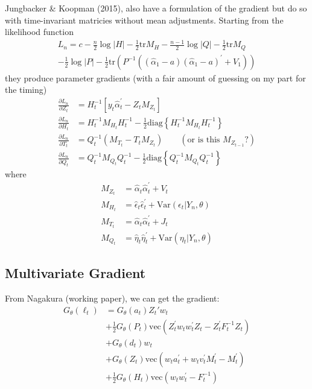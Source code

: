 \documentclass[12pt]{article}
\newcommand{\Gt}{G_\theta}
\newcommand{\vecop}[0]{\text{vec}}
\newcommand{\Var}[0]{\text{Var}}
\begin{document}
	\newpage
	Jungbacker \& Koopman (2015), also have a formulation of the gradient but do so with time-invariant matricies without mean adjustments. Starting from the likelihood function 
	\begin{align*}
	L_n = c - \frac{n}{2} \log |H| - \frac{1}{2} \text{tr} M_H - \frac{n-1}{2} \log |Q| - \frac{1}{2} \text{tr} M_Q \\ 
	- \frac{1}{2} \log |P| - \frac{1}{2} \text{tr} \left(P^{-1} ((\hat{\alpha}_1 - a) (\hat{\alpha}_1 - a)^\prime + V_1) \right)
	\end{align*}
	they produce parameter gradients (with a fair amount of guessing on my part for the timing)
	\begin{align*}
	\frac{\partial L_n}{\partial Z_t} &= H_t^{-1} \left[y_t\hat{\alpha}_t^\prime - Z_t M_{Z_t} \right] \\
	\frac{\partial L_n}{\partial H_t} &= H_t^{-1} M_{H_t} H_t^{-1} - \frac{1}{2} \text{diag} \left\{ H_t^{-1} M_{H_t} H_t^{-1}\right\} \\
	\frac{\partial L_n}{\partial T_t} &= Q_t^{-1} (M_{T_t} - T_t M_{Z_t}) \qquad (\text{or is this } M_{Z_{t-1}}?) \\
	\frac{\partial L_n}{\partial Q_t} &= Q_t^{-1} M_{Q_t} Q_t^{-1} - \frac{1}{2} \text{diag} \left\{ Q_t^{-1} M_{Q_t} Q_t^{-1} \right\} 
	\end{align*}
	where 
	\begin{align*}
	M_{Z_t} &= \hat{\alpha}_t \hat{\alpha}_t^\prime + V_t\\
	M_{H_t} &= \hat{\epsilon}_t \hat{\epsilon}_t^\prime + \Var(\epsilon_t | Y_n, \theta) \\
	M_{T_t} &= \hat{\alpha}_t \hat{\alpha}_t^\prime + J_t\\
	M_{Q_t} &= \hat{\eta}_t \hat{\eta}_t^\prime + \Var(\eta_t | Y_n, \theta) 
	\end{align*}

\newpage
\subsection*{Multivariate Gradient}
	From Nagakura (working paper), we can get the gradient:
	\begin{align*}
	\Gt(\ell_t) &= \Gt(a_t) Z_t' w_t  \\
	 &+ \frac{1}{2} \Gt(P_t) \vecop (Z_t^\prime w_t w_t^\prime Z_t - Z_t^\prime F_t^{-1} Z_t) \\
	 &+ \Gt(d_t) w_t \\
	 &+ \Gt(Z_t) \vecop (w_t a_t^\prime + w_t v_t^\prime M_t^\prime - M_t^\prime) \\
	 &+ \frac{1}{2} \Gt(H_t) \vecop (w_t w_t^\prime - F_t^{-1})
	\end{align*}
\end{document}
